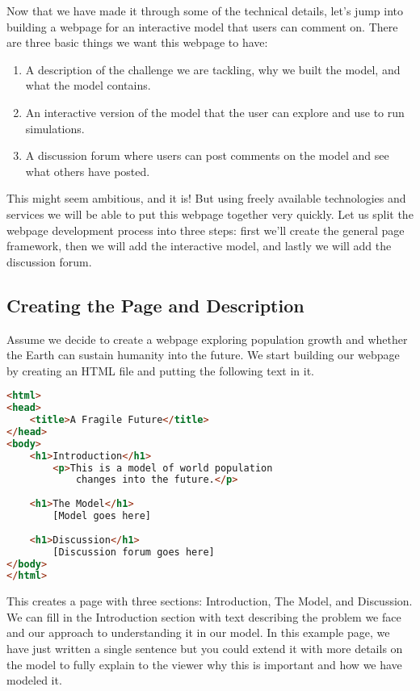 \documentclass[]{memoir}
\begin{document}
Now that we have made it through some of the technical details, let's
jump into building a webpage for an interactive model that users can
comment on. There are three basic things we want this webpage to have:

\begin{enumerate}
\def\labelenumi{\arabic{enumi}.}
\itemsep1pt\parskip0pt
\item
  A description of the challenge we are tackling, why we built the
  model, and what the model contains.
\item
  An interactive version of the model that the user can explore and use
  to run simulations.
\item
  A discussion forum where users can post comments on the model and see
  what others have posted.
\end{enumerate}

This might seem ambitious, and it is! But using freely available
technologies and services we will be able to put this webpage together
very quickly. Let us split the webpage development process into three
steps: first we'll create the general page framework, then we will add
the interactive model, and lastly we will add the discussion forum.

\subsection{Creating the Page and Description}

Assume we decide to create a webpage exploring population growth and
whether the Earth can sustain humanity into the future. We start
building our webpage by creating an HTML file and putting the following
text in it.

\begin{lstlisting}[language=HTML]
<html>
<head>
    <title>A Fragile Future</title>
</head>
<body>
    <h1>Introduction</h1>
        <p>This is a model of world population
            changes into the future.</p>
            
    <h1>The Model</h1>
        [Model goes here]
        
    <h1>Discussion</h1>
        [Discussion forum goes here]
</body>
</html>
\end{lstlisting}

This creates a page with three sections: Introduction, The Model, and
Discussion. We can fill in the Introduction section with text describing
the problem we face and our approach to understanding it in our model.
In this example page, we have just written a single sentence but you
could extend it with more details on the model to fully explain to the
viewer why this is important and how we have modeled it.
\end{document}
